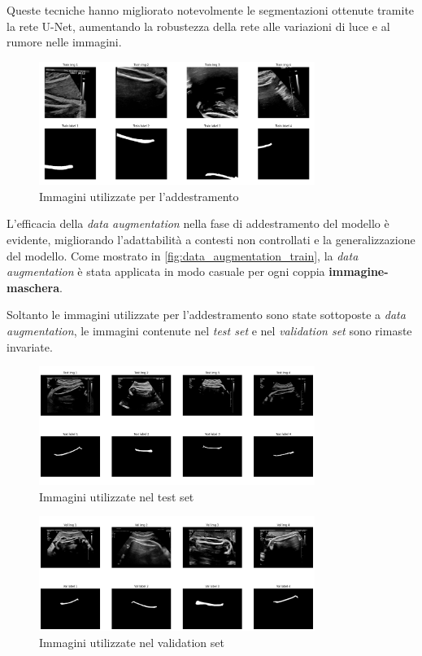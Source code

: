 Queste tecniche hanno migliorato notevolmente le segmentazioni ottenute tramite la rete U-Net,
aumentando la robustezza della rete alle variazioni di luce e al rumore nelle immagini.

\begin{figure}[!ht]
	\centering
	\includegraphics[width=0.8\textwidth]{Immagini/data_augmentation_train.png}
	\caption{Immagini utilizzate per l'addestramento}
	\label{fig:data_augmentation_train}
\end{figure}

L'efficacia della \textit{data augmentation} nella fase di addestramento del modello è evidente,
migliorando l'adattabilità a contesti non controllati e la generalizzazione del modello. Come
mostrato in \autoref{fig:data_augmentation_train}, la \textit{data augmentation} è stata applicata in modo
casuale per ogni coppia \textbf{immagine-maschera}.

Soltanto le immagini utilizzate per l'addestramento sono state sottoposte a \textit{data augmentation},
le immagini contenute nel \textit{test set} e nel \textit{validation set} sono rimaste invariate.


\begin{figure}[!ht]
	\centering
	\includegraphics[width=0.8\textwidth]{Immagini/data_augmentation_test.png}
	\caption{Immagini utilizzate nel test set}
	\label{fig:data_augmentation_test}
\end{figure}

\begin{figure}[!ht]
	\centering
	\includegraphics[width=0.8\textwidth]{Immagini/data_augmentation_val.png}
	\caption{Immagini utilizzate nel validation set}
	\label{fig:data_augmentation_val}
\end{figure}


